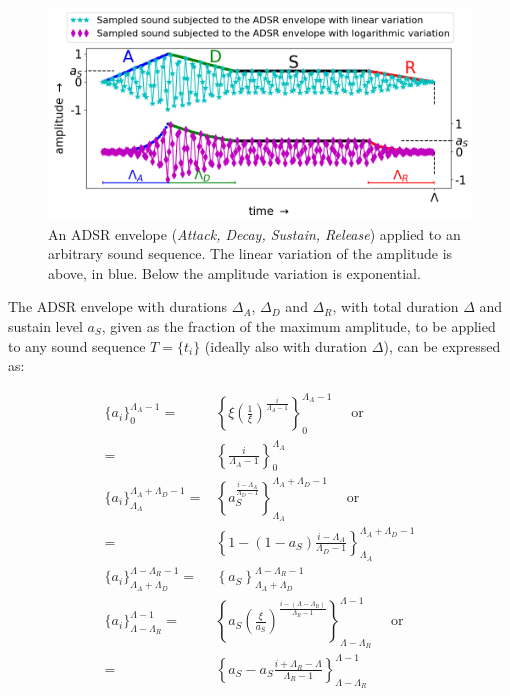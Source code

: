 \begin{figure}[htp!]
    \centering
        \includegraphics[width=\columnwidth]{figures/adsr_}
    \caption{An ADSR envelope (\emph{Attack, Decay, Sustain, Release}) applied to an arbitrary sound sequence. The linear variation of the amplitude is above, in blue. Below the amplitude variation is exponential.}
        \label{fig:adsr}
\end{figure}

The ADSR envelope with durations $\Delta_A$, $\Delta_D$ and $\Delta_R$, with total duration $\Delta$ and sustain level $a_S$, given as the fraction of the maximum amplitude, to be applied to any sound sequence $T=\{t_i\}$ (ideally also with duration $\Delta$), can be expressed as:

\begin{equation}\label{eq:adsr}
\begin{split}
\{a_i\}_0^{\Lambda_A-1}  = & \left\{\xi\left(\frac{1}{\xi}\right)^{\frac{i}{\Lambda_A-1}}\right\}_0^{\Lambda_A-1} \quad \text{ or }\\ = & \left\{\frac{i}{\Lambda_A-1}\right\}_0^{\Lambda_A}\\
\{a_i\}_{\Lambda_A}^{\Lambda_A+\Lambda_D-1} = & \left\{a_S^{\frac{i-\Lambda_A}{\Lambda_D-1}}  \right\}_{\Lambda_A}^{\Lambda_A+\Lambda_D-1} \quad \text{ or } \\ = &  \left\{1-(1-a_S)\frac{i-\Lambda_A}{\Lambda_D-1}\right\}_{\Lambda_A}^{\Lambda_A+\Lambda_D-1}\\
\{ a_i \}_{\Lambda_A+\Lambda_D}^{\Lambda-\Lambda_R-1} = & \left\{ a_S \right\}_{\Lambda_A+\Lambda_D}^{\Lambda-\Lambda_R-1} \\
\{ a_i \}_{\Lambda-\Lambda_R}^{\Lambda-1}  = & \left\{ a_S\left(\frac{\xi}{a_S} \right)^{\frac{i-(\Lambda-\Lambda_R)}{\Lambda_R-1}} \right\}_{\Lambda-\Lambda_R}^{\Lambda-1} \quad \text{ or } \\ = &  \left\{ a_S - a_S\frac{i+\Lambda_R-\Lambda}{\Lambda_R-1}\right\}_{\Lambda-\Lambda_R}^{\Lambda-1} 
\end{split}
\end{equation}

